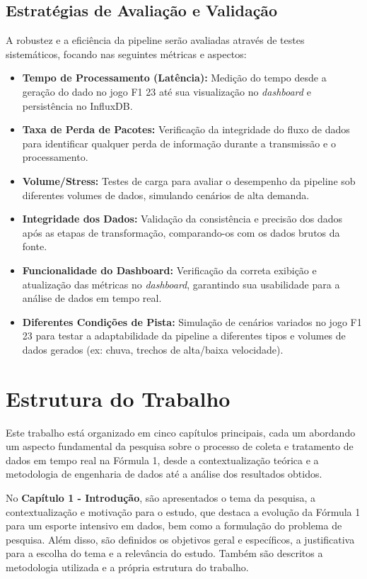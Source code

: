 \documentclass[12pt, %
openright, 
oneside, %
a4paper,    %
brazil]{facom-ufu-abntex2}
\begin{document}
\subsection{Estratégias de Avaliação e Validação}
A robustez e a eficiência da pipeline serão avaliadas através de testes sistemáticos, focando nas seguintes métricas e aspectos:
\begin{itemize}
    \item \textbf{Tempo de Processamento (Latência):} Medição do tempo desde a geração do dado no jogo F1 23 até sua visualização no \textit{dashboard} e persistência no InfluxDB.
    \item \textbf{Taxa de Perda de Pacotes:} Verificação da integridade do fluxo de dados para identificar qualquer perda de informação durante a transmissão e o processamento.
    \item \textbf{Volume/Stress:} Testes de carga para avaliar o desempenho da pipeline sob diferentes volumes de dados, simulando cenários de alta demanda.
    \item \textbf{Integridade dos Dados:} Validação da consistência e precisão dos dados após as etapas de transformação, comparando-os com os dados brutos da fonte.
    \item \textbf{Funcionalidade do Dashboard:} Verificação da correta exibição e atualização das métricas no \textit{dashboard}, garantindo sua usabilidade para a análise de dados em tempo real.
    \item \textbf{Diferentes Condições de Pista:} Simulação de cenários variados no jogo F1 23 para testar a adaptabilidade da pipeline a diferentes tipos e volumes de dados gerados (ex: chuva, trechos de alta/baixa velocidade).
\end{itemize}

\section{Estrutura do Trabalho}

Este trabalho está organizado em cinco capítulos principais, cada um abordando um 
aspecto fundamental da pesquisa sobre o processo de coleta e tratamento de dados em 
tempo real na Fórmula 1, desde a contextualização teórica e a metodologia de engenharia 
de dados até a análise dos resultados obtidos.

No \textbf{Capítulo 1 - Introdução}, são apresentados o tema da pesquisa, a 
contextualização e motivação para o estudo, que destaca a evolução da Fórmula 1 para um 
esporte intensivo em dados, bem como a formulação do problema de pesquisa. Além disso, 
são definidos os objetivos geral e específicos, a justificativa para a escolha do tema 
e a relevância do estudo. Também são descritos a metodologia utilizada e a própria 
estrutura do trabalho.
\end{document}

